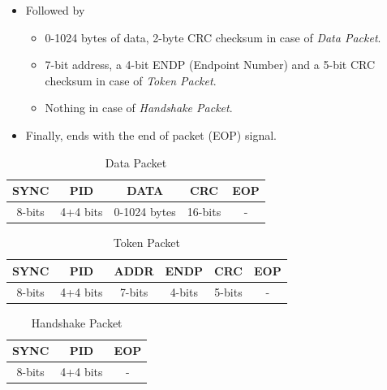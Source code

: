 \documentclass{article}
\begin{document}
\begin{itemize}
\begin{table}[H]
\begin{tabular}{|c|c|c|p{9cm}|}
                  \hline
              \end{tabular}
          \end{table}
    \item Followed by
          \begin{itemize}
              \item 0-1024 bytes of data, 2-byte CRC checksum in case of \textit{Data Packet}.
              \item 7-bit address, a 4-bit ENDP (Endpoint Number) and a  5-bit CRC checksum in case of \textit{Token Packet}.
              \item Nothing in case of \textit{Handshake Packet}.
          \end{itemize}
    \item Finally, ends with the end of packet (EOP) signal.
\end{itemize}

\begin{table}[H]
    \centering
    \caption{Data Packet}
    \begin{tabular}{|c|c|c|c|c|}
        \hline
        \textbf{SYNC} & \textbf{PID} & \textbf{DATA} & \textbf{CRC} & \textbf{EOP} \\
        \hline
        8-bits        & 4+4 bits     & 0-1024 bytes  & 16-bits      & -            \\
        \hline
    \end{tabular}
\end{table}

\begin{table}[H]
    \centering
    \caption{Token Packet}
    \begin{tabular}{|c|c|c|c|c|c|}
        \hline
        \textbf{SYNC} & \textbf{PID} & \textbf{ADDR} & \textbf{ENDP} & \textbf{CRC} & \textbf{EOP} \\
        \hline
        8-bits        & 4+4 bits     & 7-bits        & 4-bits        & 5-bits       & -            \\
        \hline
    \end{tabular}
\end{table}

\begin{table}[H]
    \centering
    \caption{Handshake Packet}
    \begin{tabular}{|c|c|c|}
        \hline
        \textbf{SYNC} & \textbf{PID} & \textbf{EOP} \\
        \hline
        8-bits        & 4+4 bits     & -            \\
        \hline
    \end{tabular}
\end{table}
\end{document}
